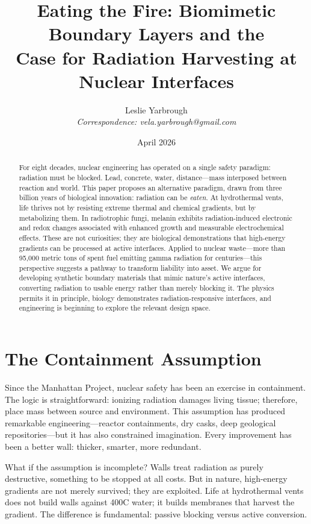 \documentclass[12pt]{article}
\title{\textbf{Eating the Fire: Biomimetic Boundary Layers and the\\
Case for Radiation Harvesting at Nuclear Interfaces}}
\author{Leslie Yarbrough\\
\small\textit{Correspondence: vela.yarbrough@gmail.com}}
\date{April 2026}
\begin{document}
\maketitle

\begin{abstract}
For eight decades, nuclear engineering has operated on a single safety paradigm:
radiation must be blocked. Lead, concrete, water, distance---mass interposed between
reaction and world. This paper proposes an alternative paradigm, drawn from three billion
years of biological innovation: radiation can be \emph{eaten}. At hydrothermal vents,
life thrives not by resisting extreme thermal and chemical gradients, but by metabolizing
them. In radiotrophic fungi, melanin exhibits radiation-induced electronic and redox
changes associated with enhanced growth and measurable electrochemical effects. These are
not curiosities; they are biological demonstrations that high-energy gradients can be
processed at active interfaces. Applied to nuclear waste---more than 95{,}000 metric tons
of spent fuel emitting gamma radiation for centuries---this perspective suggests a pathway
to transform liability into asset. We argue for developing synthetic boundary materials
that mimic nature's active interfaces, converting radiation to usable energy rather than
merely blocking it. The physics permits it in principle, biology demonstrates
radiation-responsive interfaces, and engineering is beginning to explore the relevant
design space.
\end{abstract}

\tableofcontents
\newpage

\section{The Containment Assumption}

Since the Manhattan Project, nuclear safety has been an exercise in containment. The
logic is straightforward: ionizing radiation damages living tissue; therefore, place mass
between source and environment. This assumption has produced remarkable
engineering---reactor containments, dry casks, deep geological repositories---but it has
also constrained imagination. Every improvement has been a better wall: thicker, smarter,
more redundant.

What if the assumption is incomplete? Walls treat radiation as purely destructive,
something to be stopped at all costs. But in nature, high-energy gradients are not merely
survived; they are exploited. Life at hydrothermal vents does not build walls against
400\textdegree C water; it builds membranes that harvest the gradient. The difference is
fundamental: passive blocking versus active conversion.
\end{document}

